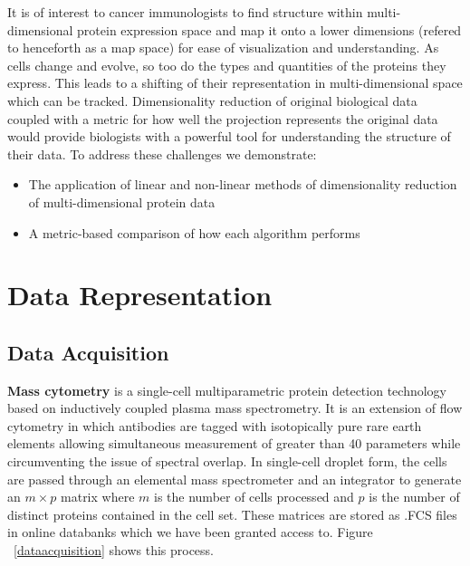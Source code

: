 \documentclass{article}
\begin{document}
It is of interest to cancer immunologists to find structure within multi-dimensional protein expression space and map it onto a lower dimensions (refered to henceforth as a map space) for ease of visualization and understanding. As cells change and evolve, so too do the types and quantities of the proteins they express. This leads to a shifting of their representation in multi-dimensional space which can be tracked. Dimensionality reduction of original biological data coupled with a metric for how well the projection represents the original data would provide biologists with a powerful tool for understanding the structure of their data. To address these challenges we demonstrate:

\begin{itemize}
\item The application of linear and non-linear methods of dimensionality reduction of multi-dimensional protein data
\item A metric-based comparison of how each algorithm performs
\end{itemize}

\section{Data Representation}
\label{data_representation}

\subsection{Data Acquisition}

\textbf{Mass cytometry} is a single-cell multiparametric protein detection technology based on inductively coupled plasma mass spectrometry. It is an extension of flow cytometry in which antibodies are tagged with isotopically pure rare earth elements allowing simultaneous measurement of greater than 40 parameters while circumventing the issue of spectral overlap. In single-cell droplet form, the cells are passed through an elemental mass spectrometer and an integrator to generate an $m \times p$ matrix where $m$ is the number of cells processed and $p$ is the number of distinct proteins contained in the cell set. These matrices are stored as .FCS files in online databanks which we have been granted access to. Figure ~\ref{dataacquisition} shows this process. 
\end{document}
